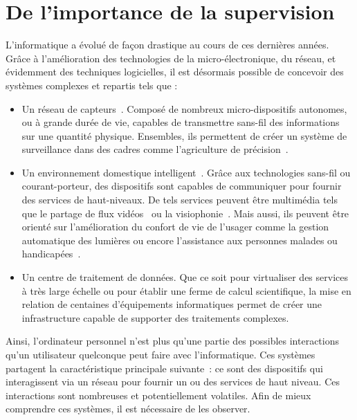 \section{De l'importance de la supervision}\label{sec:intro:contexte}

L'informatique a évolué de façon drastique au cours de ces dernières années. Grâce à l'amélioration des technologies de la micro-électronique, du réseau, et évidemment des techniques logicielles, il est désormais possible de concevoir des systèmes complexes et repartis tels que :
\begin{itemize}
 \item Un réseau de capteurs~\cite{Akyildiz:wsn,Szewczyk:monitoring}. Composé de nombreux micro-dispositifs autonomes, ou à grande durée de vie, capables de transmettre sans-fil des informations sur une quantité physique. Ensembles, ils permettent de créer un système de surveillance dans des cadres comme l'agriculture de précision~\cite{Jurdak:sumac}.
 \item Un environnement domestique intelligent~\cite{Harper:smarthome, Chan:smarthome, Coyle:assisted}. Grâce aux technologies sans-fil ou courant-porteur, des dispositifs sont capables de communiquer pour fournir des services de haut-niveaux. De tels services peuvent être multimédia tels que le partage de flux vidéos~\cite{Kang:upnpav} ou la visiophonie~\cite{Vilei:videophone}. Mais aussi, ils peuvent être orienté sur l'amélioration du confort de vie de l'usager comme la gestion automatique des lumières ou encore l'assistance aux personnes malades ou handicapées~\cite{Korhonen:health}.
 \item Un centre de traitement de données. Que ce soit pour virtualiser des services à très large échelle ou pour établir une ferme de calcul scientifique, la mise en relation de centaines d'équipements informatiques permet de créer une infrastructure capable de supporter des traitements complexes.
\end{itemize}

Ainsi, l'ordinateur personnel n'est plus qu'une partie des possibles interactions qu'un utilisateur quelconque peut faire avec l'informatique. Ces systèmes partagent la caractéristique principale suivante~: ce sont des dispositifs qui interagissent via un réseau pour fournir un ou des services de haut niveau. Ces interactions sont nombreuses et potentiellement volatiles. Afin de mieux comprendre ces systèmes, il est nécessaire de les observer.

